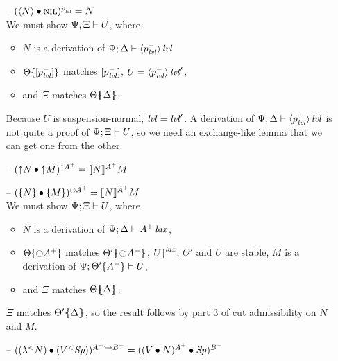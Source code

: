 \begin{itemize}
\item[--] $(\subst{\tetan{N}}{\tnil})^{p^-_\mlvl} = N$\smallskip\\
   We must show $\foc{\Psi}{\Xi}{U}$, where
   \begin{itemize}
   \item $N$ is a derivation of $\foc{\Psi}{\Delta}{\islvl{\susp{p^-_\mlvl}}}$
   \item $\tackon{\Theta}{[p^-_\mlvl]}$ matches $[p^-_\mlvl]$,
      $U = \islvl{\susp{p^-_\mlvl}}'$,
   \item and $\Xi$ matches $\frameoff{\Theta}{\Delta}$.
   \end{itemize}
   Because $U$ is suspension-normal, $\mlvl = \mlvl'$.
   A derivation of $\foc{\Psi}{\Delta}{\islvl{\susp{p^-_\mlvl}}}$ is not
   quite a proof of $\foc{\Psi}{\Xi}{U}$, so we need an exchange-like 
   lemma that we can get one from the other. \smallskip

\item[--] $(\subst{\tupr{N}}{\tupl{M}})^{{\uparrow}A^+} = \lsubsta{N}{M}{A^+}$

\item[--] $(\subst{\tlaxr{N}}{\tlaxl{M}})^{{\ocircle}A^+}
           = \lsubsta{N}{M}{A^+}$\smallskip\\
  We must show $\foc{\Psi}{\Xi}{U}$, where
  \begin{itemize}
  \item $N$ is a derivation of 
     $\foc{\Psi}{\Delta}{\islax{A^+}}$, 
  \item $\tackon{\Theta}{{\ocircle}A^+}$ matches 
     $\frameoff{\Theta'}{{\ocircle}A^+}$, 
     $\restrictfrom{U}{\mlax}$, 
     $\Theta'$ and $U$ are stable, 
     $M$ is a derivation of $\foc{\Psi}{\tackon{\Theta'}{A^+}}{U}$,
  \item and $\Xi$ matches $\frameoff{\Theta}{\Delta}$.
  \end{itemize}
  $\Xi$ matches $\frameoff{\Theta'}{\Delta}$, so the result follows
  by part 3 of cut admissibility on $N$ and $M$. \smallskip

\item[--] $(\subst{(\tlaml{N})}{(\tappl{V}{\Sp})})^{A^+ \lefti B^-}
           = (\subst{(\subst{V}{N})^{A^+}}{\Sp})^{B^-}$


\end{itemize}
